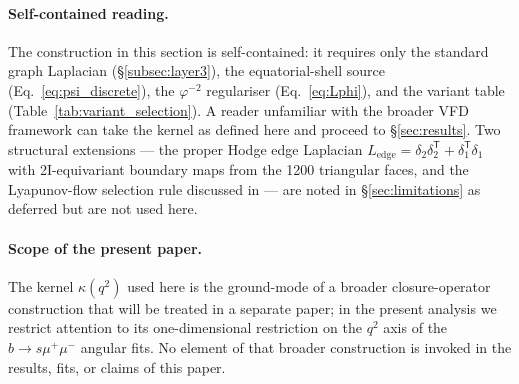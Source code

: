 \paragraph{Self-contained reading.} The construction in this section
is self-contained: it requires only the standard graph Laplacian
(\S\ref{subsec:layer3}), the equatorial-shell source
(Eq.~\ref{eq:psi_discrete}), the $\varphi^{-2}$ regulariser
(Eq.~\ref{eq:Lphi}), and the variant table
(Table~\ref{tab:variant_selection}). A reader unfamiliar with the
broader VFD framework can take the kernel as defined here and
proceed to \S\ref{sec:results}. Two structural extensions — the
proper Hodge edge Laplacian $L_{\mathrm{edge}} =
\delta_{2}\delta_{2}^{\mathsf T} + \delta_{1}^{\mathsf T}\delta_{1}$
with 2I-equivariant boundary maps from the 1200 triangular faces,
and the Lyapunov-flow selection rule discussed in
\citep{SmartAdaptiveClosureTransport2026} — are noted in
\S\ref{sec:limitations} as deferred but are not used here.

\paragraph{Scope of the present paper.} The kernel $\kappa(q^{2})$
used here is the ground-mode of a broader closure-operator
construction that will be treated in a separate paper; in the
present analysis we restrict attention to its one-dimensional
restriction on the $q^{2}$ axis of the $b\to s\mu^{+}\mu^{-}$
angular fits. No element of that broader construction is invoked in
the results, fits, or claims of this paper.
